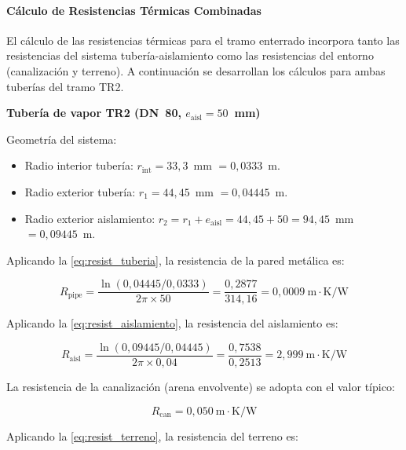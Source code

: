 \documentclass[12pt]{article}
\begin{document}
\paragraph{Cálculo de Resistencias Térmicas Combinadas}
\label{par:resistencias_termicas_combinadas}

El cálculo de las resistencias térmicas para el tramo enterrado incorpora tanto las resistencias del sistema tubería-aislamiento como las resistencias del entorno (canalización y terreno). A continuación se desarrollan los cálculos para ambas tuberías del tramo TR2.

\textbf{Tubería de vapor TR2 (DN~80, $e_{\text{aisl}} = 50$~mm)}

Geometría del sistema:

\begin{itemize}[noitemsep]
	\item Radio interior tubería: $r_{\text{int}} = 33{,}3$~mm $= 0{,}0333$~m.
	\item Radio exterior tubería: $r_1 = 44{,}45$~mm $= 0{,}04445$~m.
	\item Radio exterior aislamiento: $r_2 = r_1 + e_{\text{aisl}} = 44{,}45 + 50 = 94{,}45$~mm $= 0{,}09445$~m.
\end{itemize}

Aplicando la \eqref{eq:resist_tuberia}, la resistencia de la pared metálica es:

\begin{equation}
	R_{\text{pipe}} = \frac{\ln(0{,}04445 / 0{,}0333)}{2\pi \times 50} = \frac{0{,}2877}{314{,}16} = 0{,}0009~\text{m}\cdot\text{K/W}
	\label{eq:resist_pipe_TR2_vap}
\end{equation}

Aplicando la \eqref{eq:resist_aislamiento}, la resistencia del aislamiento es:

\begin{equation}
	R_{\text{aisl}} = \frac{\ln(0{,}09445 / 0{,}04445)}{2\pi \times 0{,}04} = \frac{0{,}7538}{0{,}2513} = 2{,}999~\text{m}\cdot\text{K/W}
	\label{eq:resist_aisl_TR2_vap}
\end{equation}

La resistencia de la canalización (arena envolvente) se adopta con el valor típico:

\begin{equation}
	R_{\text{can}} = 0{,}050~\text{m}\cdot\text{K/W}
	\label{eq:resist_can_TR2}
\end{equation}

Aplicando la \eqref{eq:resist_terreno}, la resistencia del terreno es:
\end{document}

